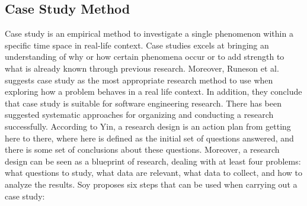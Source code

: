 \subsection{Case Study Method}

Case study is an empirical method to investigate a single phenomenon within a specific time space in real-life context\cite{Wohlin:2000:ESE:330775}. Case studies excels at bringing an understanding of why or how certain phenomena occur or to add strength to what is already known through previous research\cite{Wohlin:2000:ESE:330775,soysusan}. Moreover, Runeson et al.\cite{Runeson:2009:GCR:1519313.1519324} suggests case study as the most appropriate research method to use when exploring how a problem behaves in a real life context. In addition, they conclude that case study is suitable for software engineering research. There has been suggested systematic approaches for organizing and conducting a research successfully\cite{soysusan,Runeson:2009:GCR:1519313.1519324}. According to Yin\cite{yin2003case}, a research design is an action plan from getting here to there, where here is defined as the initial set of questions answered, and there is some set of conclusions about these questions. Moreover, a research design can be seen as a blueprint of research, dealing with at least four problems: what questions to study, what data are relevant, what data to collect, and how to analyze the results\cite{yin2003case}. Soy\cite{soysusan} proposes six steps that can be used when carrying out a case study:

